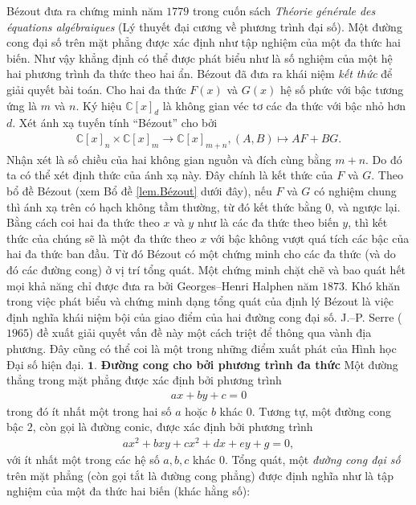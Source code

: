 \begin{multicols}{2}
	\vskip 0.1cm
	Bézout đưa ra chứng minh năm $1779$ trong cuốn sách {\em Théorie générale des équations algébraiques} (Lý thuyết đại cương về phương trình đại số). Một đường cong đại số trên mặt phẳng được xác định như tập nghiệm của một đa thức hai biến. Như vậy khẳng định có thể được phát biểu như là số nghiệm của một hệ hai phương trình đa thức theo hai ẩn.
	Bézout đã đưa ra khái niệm {\em kết thức} để giải quyết bài toán. Cho hai đa thức $F(x)$ và $G(x)$ hệ số phức với bậc tương ứng là $m$ và $n$. Ký hiệu $\mathbb C[x]_d$ là không gian véc tơ các đa thức với bậc nhỏ hơn $d$. Xét ánh xạ tuyến tính ``Bézout'' cho bởi 
	\begin{align*}
		\mathbb C[x]_n\!\times\! \mathbb C[x]_m \!\rightarrow\!  \mathbb C[x]_{m\!+\!n},
		(A,B)\!\mapsto\! AF\!+\!BG.
	\end{align*}
	Nhận xét là số chiều của hai không gian nguồn và đích cùng bằng $m+n$. Do đó ta có thể xét định thức của ánh xạ này. Đây chính là kết thức của $F$ và $G$. Theo bổ đề Bézout (xem Bổ đề \ref{lem.Bézout} dưới đây), nếu $F$ và $G$ có nghiệm chung thì ánh xạ trên có hạch không tầm thường, từ đó kết thức bằng $0$, và ngược lại. 
	\vskip 0.1cm
	Bằng cách coi hai đa thức theo $x$ và $y$ như là các đa thức theo biến $y$, thì kết thức của chúng sẽ là một đa thức theo $x$ với bậc không vượt quá tích các bậc của hai đa thức ban đầu. Từ đó Bézout có một chứng minh cho các đa thức (và do đó các đường cong) ở vị trí tổng quát. 
	\vskip 0.1cm
	Một chứng minh chặt chẽ và bao quát hết mọi khả năng chỉ được đưa ra bởi Georges--Henri Halphen năm $1873$. 
	Khó khăn trong việc phát biểu và chứng minh dạng tổng quát của định lý Bézout là việc định nghĩa khái niệm bội của giao điểm của hai đường cong đại số. J.--P. Serre ($1965$) đề xuất giải quyết vấn đề này một cách triệt để thông qua vành địa phương. Đây cũng có thể coi là một trong những điểm xuất phát của Hình học Đại số hiện đại. 
	\vskip 0.1cm
	$\pmb{1.}$ \textbf{\color{duongvaotoanhoc}Đường cong cho bởi phương trình đa thức}
	\vskip 0.1cm
	Một đường thẳng trong mặt phẳng được xác định bởi phương trình  
	\begin{align*}
		ax+by+c=0
	\end{align*}
	trong đó ít nhất một trong hai số $a$ hoặc $b$ khác $0$. Tương tự, một đường cong bậc $2$, còn gọi là đường conic, được xác định bởi phương trình
	\begin{align*}
		ax^2+bxy+cx^2+dx+ey+g=0,
	\end{align*}
	với ít nhất một trong các hệ số $a,b,c$ khác $0$.
	\vskip 0.1cm
	Tổng quát, một {\em đường cong đại số} trên mặt phẳng (còn gọi tắt là đường cong phẳng) được định nghĩa như là tập nghiệm của một đa thức hai biến (khác hằng số):

\end{multicols}
